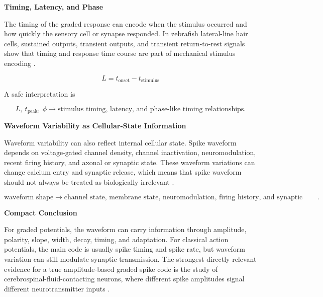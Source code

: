 \documentclass{book}
\providecommand{\ProjectDeepHeading}[2]{%
    \par\medskip\noindent\textbf{#2}\par\smallskip
}
\begin{document}
        \ProjectDeepHeading{12}{Timing, Latency, and Phase}
            
            The timing of the graded response can encode when the stimulus occurred and how quickly the sensory cell or synapse responded. In zebrafish lateral-line hair cells, sustained outputs, transient outputs, and transient return-to-rest signals show that timing and response time course are part of mechanical stimulus encoding \citep{pichler-2019-the-transfer-characteristics-of-hair-cells-encoding-mechanical-stimuli-in-the-lateral-line-of-zebrafish}.
            
            \begin{equation}
                L
                =
                t_{\mathrm{onset}}-t_{\mathrm{stimulus}}
            \end{equation}
            
            A safe interpretation is
            
            \begin{equation}
                L,\ t_{\mathrm{peak}},\ \ensuremath{\phi}
                \rightarrow
                \text{stimulus timing, latency, and phase-like timing relationships}.
            \end{equation}
        
        \ProjectDeepHeading{12}{Waveform Variability as Cellular-State Information}
            
            Waveform variability can also reflect internal cellular state. Spike waveform depends on voltage-gated channel density, channel inactivation, neuromodulation, recent firing history, and axonal or synaptic state. These waveform variations can change calcium entry and synaptic release, which means that spike waveform should not always be treated as biologically irrelevant \citep{zbili-2019-past-and-future-of-analog-digital-modulation-of-synaptic-transmission}.
            
            \begin{equation}
                \text{waveform shape}
                \rightarrow
                \text{channel state, membrane state, neuromodulation, firing history, and synaptic strength}.
            \end{equation}
        
        \ProjectDeepHeading{12}{Compact Conclusion}
            
            For graded potentials, the waveform can carry information through amplitude, polarity, slope, width, decay, timing, and adaptation. For classical action potentials, the main code is usually spike timing and spike rate, but waveform variation can still modulate synaptic transmission. The strongest directly relevant evidence for a true amplitude-based graded spike code is the study of cerebrospinal-fluid-contacting neurons, where different spike amplitudes signal different neurotransmitter inputs \citep{johnson-2023-graded-spikes-differentially-signal-neurotransmitter-input-in-cerebrospinal-fluid-contacting-neurons-of-the-mouse-spinal-cord}.
\end{document}
